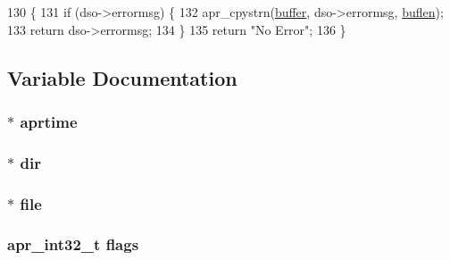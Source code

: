\begin{DoxyCode}
130 \{
131     \textcolor{keywordflow}{if} (dso->errormsg) \{
132         apr\_cpystrn(\hyperlink{group__APACHE__CORE__PROTO_gabd91b1aab0a10c5027ca2eb5577f759f}{buffer}, dso->errormsg, \hyperlink{group__APACHE__CORE__DAEMON_ga71e9cfb174fb4be19396f3f3d1b25bee}{buflen});
133         \textcolor{keywordflow}{return} dso->errormsg;
134     \}
135     \textcolor{keywordflow}{return} \textcolor{stringliteral}{"No Error"};
136 \}
\end{DoxyCode}


\subsection{Variable Documentation}
\subsubsection[{\texorpdfstring{aprtime}{aprtime}}]{ $\ast$ aprtime}\hypertarget{group__apr__portabile_gac950216cdeec5e39248681622c546ee4}{}\label{group__apr__portabile_gac950216cdeec5e39248681622c546ee4}
\subsubsection[{\texorpdfstring{dir}{dir}}]{$\ast$ dir}\hypertarget{group__apr__portabile_gaf9562e91eff06dd66cd6db440b2c3bbd}{}\label{group__apr__portabile_gaf9562e91eff06dd66cd6db440b2c3bbd}
\subsubsection[{\texorpdfstring{file}{file}}]{$\ast$ file}\hypertarget{group__apr__portabile_ga4a18bbbd412f9ca4387017cbe38eec30}{}\label{group__apr__portabile_ga4a18bbbd412f9ca4387017cbe38eec30}
\subsubsection[{\texorpdfstring{flags}{flags}}]{ {\bf apr\+\_\+int32\+\_\+t} flags}\hypertarget{group__apr__portabile_gad55b8bb3342ebfedee9b296136608c5c}{}\label{group__apr__portabile_gad55b8bb3342ebfedee9b296136608c5c}
